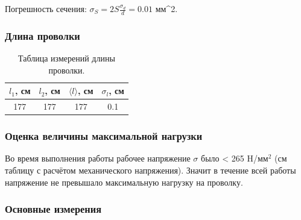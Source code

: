 \documentclass[a4paper]{article}
\begin{document}
\item Погрешность сечения: $\sigma_{S} = {2}{S}\frac{\sigma_{d}}{d} = {0.01}$ мм{^2}.\\



\subsubsection {Длина проволки}

\begin{table}[h!]
\begin{center}
\begin{tabular}{|c|c|c|c|}
\hline
$l_1$, см    & $l_2$, см    & $\langle l \rangle$, см    & $\sigma_l$, см   \\ \hline

177   & 177   &177   &{0.1}      \\ \hline

\end{tabular}
\caption{Таблица измерений длины проволки.}
\end{center}
\end{table}



\subsubsection {Оценка величины максимальной нагрузки}

Во время выполнения работы рабочее напряжение $\sigma$ было {<} {265} H/мм$^2$ (см таблицу с расчётом механического напряжения).
Значит в течение всей работы напряжение не превышало максимальную нагрузку на проволку.

\newpage
\subsubsection {Основные измерения}
\end{document}
